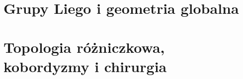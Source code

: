 \documentclass[11pt,a4paper]{report}
\begin{document}

\setcounter{chapter}{10}
\setcounter{part}{1}






\part{Grupy Liego i geometria globalna}





\part{Topologia różniczkowa, kobordyzmy i chirurgia}






\end{document}
